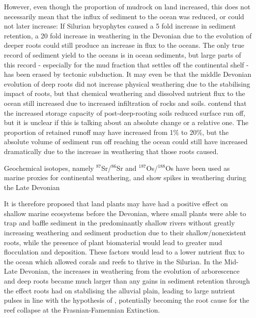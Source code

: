 \documentclass[11pt,a4paper]{article}
\begin{document}
However, even though the proportion of mudrock on land increased, this does not necessarily mean that the influx of sediment to the ocean was reduced, or could not later increase: If Silurian bryophytes caused a 5 fold increase in sediment retention, a 20 fold increase in weathering in the Devonian due to the evolution of deeper roots could still produce an increase in flux to the oceans.
 The only true record of sediment yield to the oceans is in ocean sediments, but large parts of this record - especially for the mud fraction that settles off the continental shelf - has been erased by tectonic subduction.
 It may even be that the middle Devonian evolution of deep roots did not increase physical weathering due to the stabilising impact of roots, but that chemical weathering and dissolved nutrient flux to the ocean still increased due to increased infiltration of rocks and soils. %
  \cite{Davies2010} contend that the increased storage capacity of post-deep-rooting soils reduced surface run off, but it is unclear if this is talking about an absolute change or a relative one.
 The proportion of retained runoff may have increased from 1\% to 20\%, but the absolute volume of sediment run off reaching the ocean could still have increased dramatically due to the increase in weathering that those roots caused.
 
Geochemical isotopes, namely $^{87}$Sr/$^{86}$Sr and $^{187}$Os/$^{188}$Os \citep{Percival2019} have been used as marine proxies for continental weathering, and show spikes in weathering during the Late Devonian

It is therefore proposed that land plants may have had a positive effect on shallow marine ecosystems before the Devonian, where small plants were able to trap and baffle sediment in the predominantly shallow rivers without greatly increasing weathering and sediment production due to their shallow/nonexistent roots, while the presence of plant biomaterial would lead to greater mud flocculation and deposition.
These factors would lead to a lower nutrient flux to the ocean which allowed corals and reefs to thrive in the Silurian.
 In the Mid-Late Devonian, the increases in weathering from the evolution of arborescence and deep roots became much larger than any gains in sediment retention through the effect roots had on stabilising the alluvial plain, leading to large nutrient pulses in line with the hypothesis of \cite{Algeo1995}, potentially becoming the root cause for the reef collapse at the Frasnian-Famennian Extinction.
\end{document}
